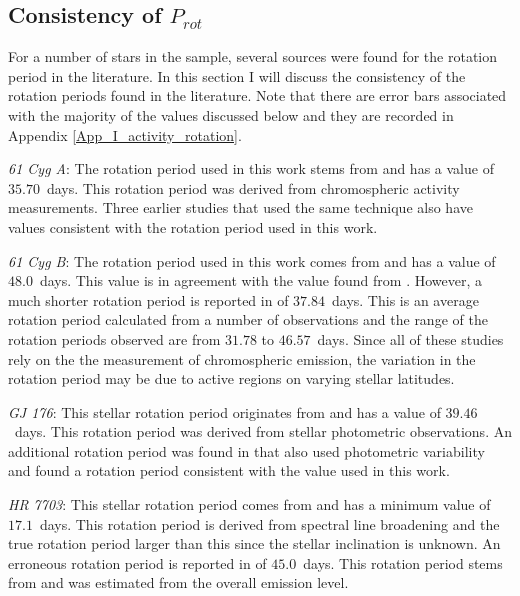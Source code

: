 \subsection{Consistency of \texorpdfstring{$P_{rot}$}{Prot}}
For a number of stars in the sample, several sources were found for the rotation period in the literature. In this section I will discuss the consistency of the rotation periods found in the literature. Note that there are error bars associated with the majority of the values discussed below and they are recorded in Appendix \ref{App_I_activity_rotation}.

\textit{61 Cyg A}: The rotation period used in this work stems from \citet{Boro_Saikia_etal_2016} and has a value of $35.70$~days. This rotation period was derived from chromospheric activity measurements. Three earlier studies that used the same technique \citep{Vaughan_etal_1981,Hallam_Wolff_1981,Donahue_etal_1996} also have values consistent with the rotation period used in this work.

\textit{61 Cyg B}: The rotation period used in this work comes from \citet{Vaughan_etal_1981} and has a value of $48.0$~days. This value is in agreement with the value found from \citet{Hallam_Wolff_1981}. However, a much shorter rotation period is reported in \citet{Donahue_etal_1996} of $37.84$~days. This is an average rotation period calculated from a number of observations and the range of the rotation periods observed are from $31.78$ to $46.57$~days. Since all of these studies rely on the the measurement of chromospheric emission, the variation in the rotation period may be due to active regions on varying stellar latitudes.

\textit{GJ 176}: This stellar rotation period originates from \citet{Robertson_etal_2015_GJ176} and has a value of $39.46$~days. This rotation period was derived from stellar photometric observations. An additional rotation period was found in \citet{Kiraga_Stepien_2007} that also used photometric variability and found a rotation period consistent with the value used in this work.

\textit{HR 7703}: This stellar rotation period comes from \citet{Ammler_vonEiff_Reiners_2012} and has a minimum value of $17.1$~days. This rotation period is derived from spectral line broadening and the true rotation period larger than this since the stellar inclination is unknown. An erroneous rotation period is reported in \citet{Pizzolato_etal_2003} of $45.0$~days. This rotation period stems from \citet{Saar_etal_1997} and was estimated from the overall \caII emission level.


